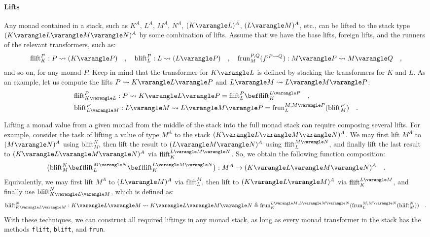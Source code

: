 \paragraph{Lifts}

Any monad contained in a stack, such as $K^{A}$, $L^{A}$, $M^{A}$,
$N^{A}$, $(K\varangle L)^{A}$, $(L\varangle M)^{A}$, etc., can
be lifted to the stack type $(K\varangle L\varangle M\varangle N)^{A}$
by some combination of lifts. Assume that we have the base lifts,
foreign lifts, and the runners of the relevant transformers, such
as:
\[
\text{flift}_{K}^{P}:P\leadsto(K\varangle P)\quad,\quad\text{blift}_{L}^{P}:L\leadsto(L\varangle P)\quad,\quad\text{frun}_{M}^{P,Q}(f^{:P\leadsto Q}):M\varangle P\leadsto M\varangle Q\quad,
\]
and so on, for any monad $P$. Keep in mind that the transformer for
$K\varangle L$ is defined by stacking the transformers for $K$ and
$L$. As an example, let us compute the lifts $P\leadsto K\varangle L\varangle P$
and $L\varangle M\leadsto L\varangle M\varangle P$: 
\begin{align*}
 & \text{flift}_{K\varangle L}^{P}:P\leadsto K\varangle L\varangle P=\text{flift}_{L}^{P}\bef\text{flift}_{K}^{L\varangle P}\quad,\\
 & \text{blift}_{L\varangle M}^{P}:L\varangle M\leadsto L\varangle M\varangle P=\text{frun}_{L}^{M,M\varangle P}(\text{blift}_{M}^{P})\quad.
\end{align*}

Lifting a monad value from a given monad from the middle of the stack
into the full monad stack can require composing several lifts. For
example, consider the task of lifting a value of type $M^{A}$ to
the stack $(K\varangle L\varangle M\varangle N)^{A}$. We may first
lift $M^{A}$ to $(M\varangle N)^{A}$ using $\text{blift}_{M}^{N}$,
then lift the result to $(L\varangle M\varangle N)^{A}$ using $\text{flift}_{L}^{M\varangle N}$,
and finally lift the last result to $(K\varangle L\varangle M\varangle N)^{A}$
via $\text{flift}_{K}^{L\varangle M\varangle N}$. So, we obtain the
following function composition:
\[
\big(\text{blift}_{M}^{N}\bef\text{flift}_{L}^{M\varangle N}\bef\text{flift}_{K}^{L\varangle M\varangle N}\big):M^{A}\rightarrow(K\varangle L\varangle M\varangle N)^{A}\quad.
\]
Equivalently, we may first lift $M^{A}$ to $(L\varangle M)^{A}$
via $\text{flift}_{L}^{M}$, then lift to $(K\varangle L\varangle M)^{A}$
via $\text{flift}_{K}^{L\varangle M}$, and finally use $\text{blift}_{K\varangle L\varangle M}^{N}$,
which is defined as:
\[
\text{blift}_{K\varangle L\varangle M}^{N}:K\varangle L\varangle M\leadsto K\varangle L\varangle M\varangle N\triangleq\text{frun}_{K}^{L\varangle M,L\varangle M\varangle N}(\text{frun}_{L}^{M,M\varangle N}(\text{blift}_{M}^{N}))\quad.
\]
With these techniques, we can construct all required liftings in any
monad stack, as long as every monad transformer in the stack has the
methods \lstinline!flift!, \lstinline!blift!, and \lstinline!frun!.

